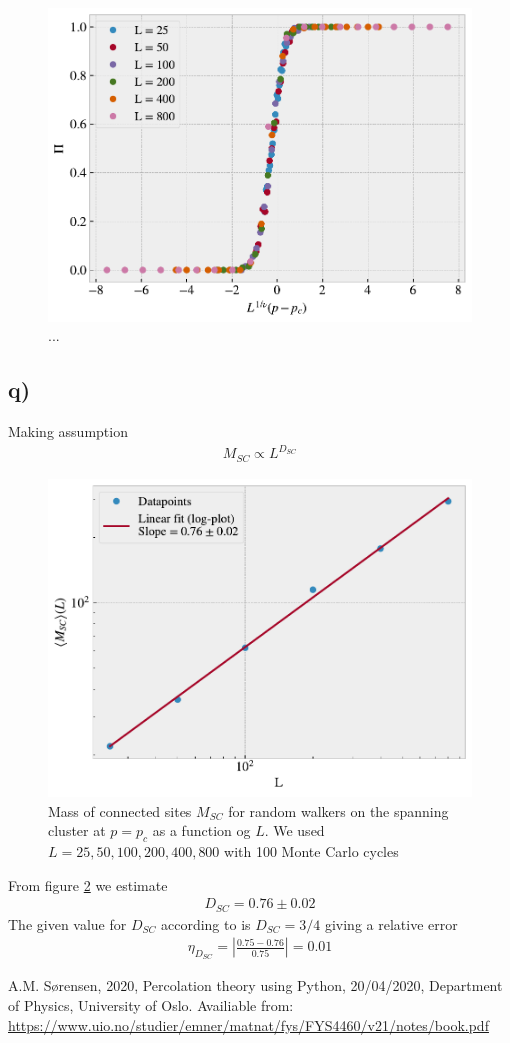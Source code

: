 \documentclass[reprint, amsmath, amssymb, aps]{revtex4-2}
\begin{document}
\begin{figure}[H]
  \includegraphics[width=\linewidth]{figures/n2.pdf}
  \caption{...}
  \label{fig:n2}
\end{figure}
%
%
\subsection*{q)}
Making assumption
\begin{align*}
  M_{SC} \propto L^{D_{SC}}
\end{align*}
\begin{figure}[H]
  \includegraphics[width=\linewidth]{figures/q.pdf}
  \caption{Mass of connected sites $M_{SC}$ for random walkers on the spanning cluster at $p = p_c$ as a function og $L$. We used $L = 25,50,100,200,400,800$ with 100 Monte Carlo cycles}
  \label{fig:q}
\end{figure}
From figure \ref{fig:q} we estimate
\begin{align*}
  D_{SC} = 0.76 \pm 0.02
\end{align*}
The given value for $D_{SC}$ according to \cite{textbook} is $D_{SC} = 3/4$ giving a relative error
\begin{align*}
  \eta_{D_{SC}}= \left|\frac{0.75 - 0.76}{0.75}\right| = 0.01
\end{align*}



\clearpage
\begin{thebibliography}{9}
   A.M. Sørensen, 2020, Percolation theory using Python, 20/04/2020, Department of Physics, University of Oslo. Availiable from: \url{https://www.uio.no/studier/emner/matnat/fys/FYS4460/v21/notes/book.pdf}
\end{thebibliography}
\end{document}
